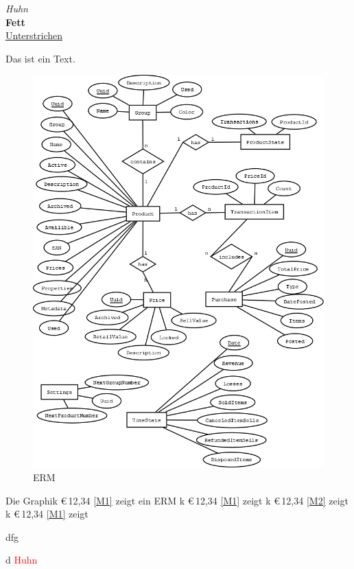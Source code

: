 \emph{Huhn} \\
\textbf{Fett} \\
\underline{Unterstrichen} \par
Das ist ein  Text. \\
\begin{figure}[ht]
	\centering
	\includegraphics[width=1\linewidth]{ERM.png}
	\caption{ERM}
	\label{M2}
\end{figure}

\newpage
Die Graphik \euro\,12,34 \vref{M1} zeigt ein ERM \cite{tiobe-index} k \euro\,12,34 \vref{M1} zeigt k \euro\,12,34 \vref{M2} zeigt k \euro\,12,34 \vref{M1} zeigt

dfg \par
d
\textcolor{red}{Huhn}